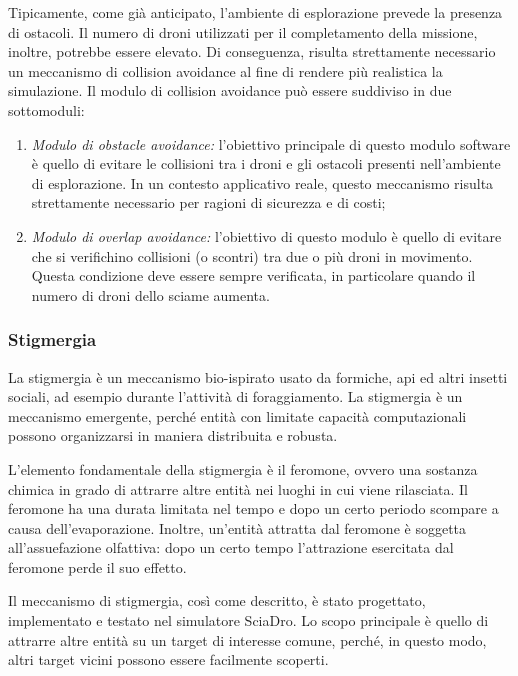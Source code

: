 Tipicamente, come già anticipato, l’ambiente di esplorazione prevede la presenza di ostacoli. 
Il numero di droni utilizzati per il completamento della missione, inoltre, potrebbe essere elevato.
Di conseguenza, risulta strettamente necessario un meccanismo di collision avoidance al fine di rendere più realistica la simulazione. 
Il modulo di collision avoidance può essere suddiviso in due sottomoduli:

\begin{enumerate}
    \item \textit{Modulo di obstacle avoidance:} l’obiettivo principale di questo modulo software è quello di evitare le collisioni tra i droni e gli ostacoli presenti nell’ambiente di esplorazione. 
    In un contesto applicativo reale, questo meccanismo risulta strettamente necessario per ragioni di sicurezza e di costi;
    \item \textit{Modulo di overlap avoidance:} l’obiettivo di questo modulo è quello di evitare che si verifichino collisioni (o scontri) tra due o più droni in movimento. 
    Questa condizione deve essere sempre verificata, in particolare quando il numero di droni dello sciame aumenta.
\end{enumerate}

\subsubsection{Stigmergia}

La stigmergia è un meccanismo bio-ispirato usato da formiche, api ed altri insetti sociali, ad esempio durante l’attività di foraggiamento. 
La stigmergia è un meccanismo emergente, perché entità con limitate capacità computazionali possono organizzarsi in maniera distribuita e robusta.

L’elemento fondamentale della stigmergia è il feromone, ovvero una sostanza chimica in grado di attrarre altre entità nei luoghi in cui viene rilasciata. 
Il feromone ha una durata limitata nel tempo e dopo un certo periodo scompare a causa dell’evaporazione. 
Inoltre, un’entità attratta dal feromone è soggetta all’assuefazione olfattiva: dopo un certo tempo l’attrazione esercitata dal feromone perde il suo effetto.

Il meccanismo di stigmergia, così come descritto, è stato progettato, implementato e testato nel simulatore SciaDro. 
Lo scopo principale è quello di attrarre altre entità su un target di interesse comune, perché, in questo modo, altri target vicini possono essere facilmente scoperti.

